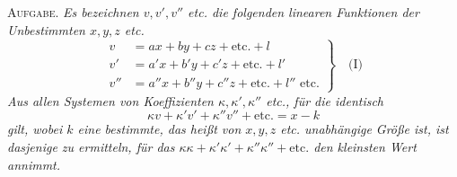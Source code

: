 \textsc{Aufgabe.} \textit{Es bezeichnen \(v,v',v''\) etc. die folgenden linearen Funktionen der Unbestimmten \(x,y,z\) etc.}
\[
\left.\begin{aligned}
v&=ax+by+cz+\text{etc.}+l\\
v'&=a'x+b'y+c'z+\text{etc.}+l'\\
v''&=a''x+b''y+c''z+\text{etc.}+l''\text{ etc.}
\end{aligned}\right\}\quad\text{(I)}
\]
\textit{Aus allen Systemen von Koeffizienten \(\kappa,\kappa',\kappa''\) etc., für die identisch}
\[
\kappa v+\kappa'v'+\kappa''v''+\text{etc.}=x-k
\]
\textit{gilt, wobei \(k\) eine bestimmte, das heißt von \(x,y,z\) etc. unabhängige Größe ist, ist dasjenige zu ermitteln, für das \(\kappa\kappa+\kappa'\kappa'+\kappa''\kappa''+\text{etc.}\) den kleinsten Wert annimmt.}


